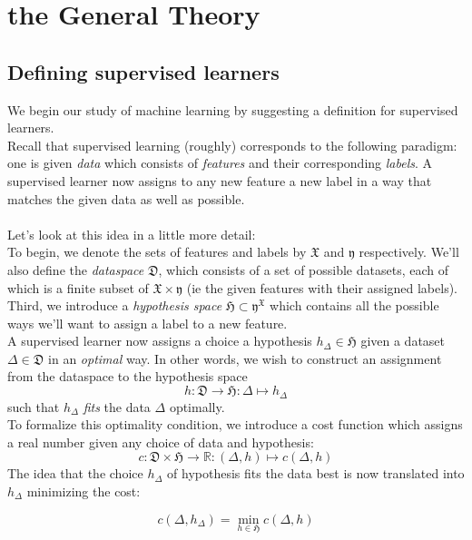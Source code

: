 \documentclass{book}
\theoremstyle{plain}
\theoremstyle{definition}
\renewcommand{\d}[1]{\mathbb{#1}}
\newcommand{\f}[1]{\mathfrak{#1}}
\newcommand{\fun}{\mapsto}
\newcommand{\mor}{\longrightarrow}
\begin{document}
\chapter{the General Theory}
\section{Defining supervised learners}
We begin our study of machine learning by suggesting a definition for supervised learners.\\
Recall that supervised learning (roughly) corresponds to the following paradigm: one is given \emph{data} which consists of \emph{features} and their corresponding \emph{labels}. A supervised learner now assigns to any new feature a new label in a way that matches the given data as well as possible.\\\\
Let's look at this idea in a little more detail:\\ 
To begin, we denote the sets of features and labels by $\f{X}$ and $\f{y}$ respectively. We'll also define the \emph{dataspace} $\f{D}$, which consists of a set of possible datasets, each of which is a finite subset of $\f{X}\times \f{y}$ (ie the given features with their assigned labels). Third, we introduce a \emph{hypothesis space} $\f{H}\subset \f{y}^\f{X}$ which contains all the possible ways we'll want to assign a label to a new feature.\\
A supervised learner now assigns a choice a hypothesis $h_\Delta \in \f{H}$ given a dataset $\Delta \in \f{D}$ in an \emph{optimal} way. In other words, we wish to construct an assignment from the dataspace to the hypothesis space
\[
h:\f{D}\mor \f{H}: \Delta\fun h_\Delta
\]
such that $h_\Delta$ \emph{fits} the data $\Delta$ optimally.\\ To formalize this optimality condition, we introduce a cost function which assigns a real number given any choice of data and hypothesis:
\[c: \f{D}\times \f{H}\mor \d{R}: (\Delta,h)\fun c(\Delta,h) \]
The idea that the choice $h_\Delta$ of hypothesis fits the data best is now translated into $h_\Delta$ minimizing the cost:

\begin{equation} \label{eq:learningcondition}
	c(\Delta,h_\Delta)=\min_{h\in \f{H}} c(\Delta,h)
\end{equation}
\end{document}
